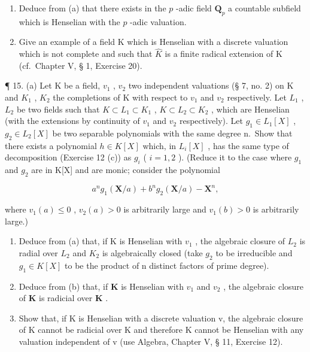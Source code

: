 \begin{enumerate}
\def\labelenumi{(\alph{enumi})}
\setcounter{enumi}{1}
\item
  Deduce from (a) that there exists in the \(p\) -adic field \(\mathbf{Q}_p\) a countable subfield which is Henselian with the \(p\) -adic valuation.
\item
  Give an example of a field K which is Henselian with a discrete valuation which is not complete and such that \(\hat{K}\) is a finite radical extension of K (cf.~Chapter V, § 1, Exercise 20).
\end{enumerate}

¶ 15. (a) Let K be a field, \(v_1\) , \(v_2\) two independent valuations (§ 7, no. 2) on K and \(K_1\) , \(K_2\) the completions of K with respect to \(v_1\) and \(v_2\) respectively. Let \(L_1\) , \(L_2\) be two fields such that \(K \subset L_1 \subset K_1\) , \(K \subset L_2 \subset K_2\) , which are Henselian (with the extensions by continuity of \(v_1\) and \(v_2\) respectively). Let \(g_1 \in L_1[X]\) , \(g_2 \in L_2[X]\) be two separable polynomials with the same degree n.~Show that there exists a polynomial \(h \in K[X]\) which, in \(L_i[X]\) , has the same type of decomposition (Exercise 12 (c)) as \(g_i\) ( \(i = 1, 2\) ). (Reduce it to the case where \(g_1\) and \(g_2\) are in K{[}X{]} and are monic; consider the polynomial

\[
a ^ {n} g _ {1} (\mathbf {X} / a) + b ^ {n} g _ {2} (\mathbf {X} / a) - \mathbf {X} ^ {n},
\]

where \(v_{1}(a) \leqslant 0\) , \(v_{2}(a) > 0\) is arbitrarily large and \(v_{1}(b) > 0\) is arbitrarily large.)

\begin{enumerate}
\def\labelenumi{(\alph{enumi})}
\setcounter{enumi}{1}
\item
  Deduce from (a) that, if K is Henselian with \(v_{1}\) , the algebraic closure of \(L_{2}\) is radial over \(L_{2}\) and \(K_{2}\) is algebraically closed (take \(g_{2}\) to be irreducible and \(g_{1} \in K[X]\) to be the product of n distinct factors of prime degree).
\item
  Deduce from (b) that, if \(\mathbf{K}\) is Henselian with \(v_{1}\) and \(v_{2}\) , the algebraic closure of \(\mathbf{K}\) is radicial over \(\mathbf{K}\) .
\item
  Show that, if K is Henselian with a discrete valuation v, the algebraic closure of K cannot be radicial over K and therefore K cannot be Henselian with any valuation independent of v (use Algebra, Chapter V, § 11, Exercise 12).
\end{enumerate}

